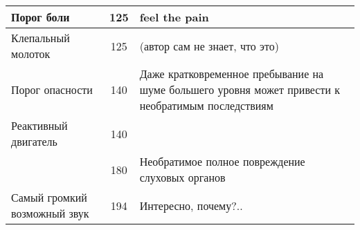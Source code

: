 \begin{center}
\begin{longtable}{|p{}|c|p{}|}
    \hline
    Порог боли & 125 & \small{feel the pain}                          \\
    \hline
    Клепальный молоток & 125 & \small{(автор сам не знает, что это)}          \\
    \hline
    Порог опасности & 140 & \small{Даже кратковременное пребывание на
    шуме большего уровня может привести к необратимым последствиям}                       \\
    \hline
    Реактивный двигатель & 140 &                                                \\
    & 180 & \small{Необратимое полное повреждение
    слуховых органов}                                        \\
    Самый громкий возможный звук & 194 & \small{Интересно, почему?..}                   \\
  \end{longtable}
\end{center}
